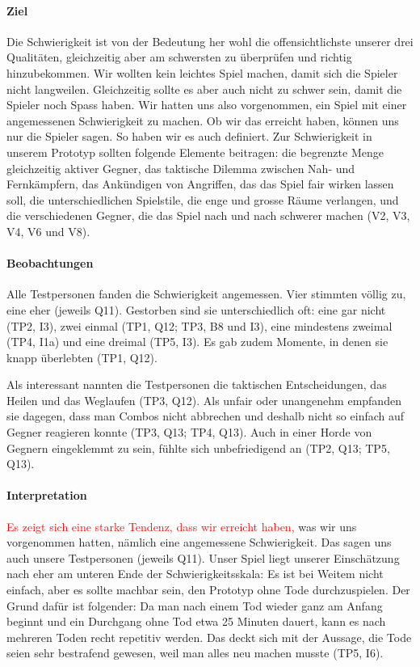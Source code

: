 \documentclass[../Main.tex]{subfiles}
\begin{document}
\paragraph{Ziel}
Die Schwierigkeit ist von der Bedeutung her wohl die offensichtlichste unserer drei Qualitäten, gleichzeitig aber am schwersten zu überprüfen und richtig hinzubekommen. Wir wollten kein leichtes Spiel machen, damit sich die Spieler nicht langweilen. Gleichzeitig sollte es aber auch nicht zu schwer sein, damit die Spieler noch Spass haben. Wir hatten uns also vorgenommen, ein Spiel mit einer angemessenen Schwierigkeit zu machen. Ob wir das erreicht haben, können uns nur die Spieler sagen. So haben wir es auch definiert. Zur Schwierigkeit in unserem Prototyp sollten folgende Elemente beitragen: die begrenzte Menge gleichzeitig aktiver Gegner, das taktische Dilemma zwischen Nah- und Fernkämpfern, das Ankündigen von Angriffen, das das Spiel fair wirken lassen soll, die unterschiedlichen Spielstile, die enge und grosse Räume verlangen, und die verschiedenen Gegner, die das Spiel nach und nach schwerer machen (V2, V3, V4, V6 und V8).

\paragraph{Beobachtungen}
Alle Testpersonen fanden die Schwierigkeit angemessen. Vier stimmten völlig zu, eine eher (jeweils Q11). Gestorben sind sie unterschiedlich oft: eine gar nicht (TP2, I3), zwei einmal (TP1, Q12; TP3, B8 und I3), eine mindestens zweimal (TP4, I1a) und eine dreimal (TP5, I3). Es gab zudem Momente, in denen sie knapp überlebten (TP1, Q12).

Als interessant nannten die Testpersonen die taktischen Entscheidungen, das Heilen und das Weglaufen (TP3, Q12). Als unfair oder unangenehm empfanden sie dagegen, dass man Combos nicht abbrechen und deshalb nicht so einfach auf Gegner reagieren konnte (TP3, Q13; TP4, Q13). Auch in einer Horde von Gegnern eingeklemmt zu sein, fühlte sich unbefriedigend an (TP2, Q13; TP5, Q13).

\paragraph{Interpretation}
\textcolor{red}{Es zeigt sich eine starke Tendenz, dass wir erreicht haben,} was wir uns vorgenommen hatten, nämlich eine angemessene Schwierigkeit. Das sagen uns auch unsere Testpersonen (jeweils Q11). Unser Spiel liegt unserer Einschätzung nach eher am unteren Ende der Schwierigkeitsskala: Es ist bei Weitem nicht einfach, aber es sollte machbar sein, den Prototyp ohne Tode durchzuspielen. Der Grund dafür ist folgender: Da man nach einem Tod wieder ganz am Anfang beginnt und ein Durchgang ohne Tod etwa 25 Minuten dauert, kann es nach mehreren Toden recht repetitiv werden. Das deckt sich mit der Aussage, die Tode seien sehr bestrafend gewesen, weil man alles neu machen musste (TP5, I6).
\end{document}
